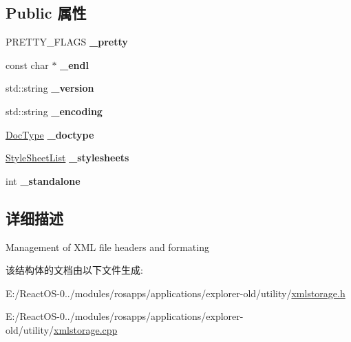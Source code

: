 \subsection*{Public 属性}
\begin{DoxyCompactItemize}
\item 
\mbox{\label{struct_x_m_l_storage_1_1_x_m_l_format_aac71a6dd578f9a09d35def6f3ffdad4e}} 
P\+R\+E\+T\+T\+Y\+\_\+\+F\+L\+A\+GS {\bfseries \+\_\+pretty}
\item 
\mbox{\label{struct_x_m_l_storage_1_1_x_m_l_format_a005c11c99db5757860a841e9a7d739d9}} 
const char $\ast$ {\bfseries \+\_\+endl}
\item 
\mbox{\label{struct_x_m_l_storage_1_1_x_m_l_format_aae13fc148edfc2b4342d849ee505d46e}} 
std\+::string {\bfseries \+\_\+version}
\item 
\mbox{\label{struct_x_m_l_storage_1_1_x_m_l_format_aa838d8817c7f68544ef41c76dbc60318}} 
std\+::string {\bfseries \+\_\+encoding}
\item 
\mbox{\label{struct_x_m_l_storage_1_1_x_m_l_format_a3fffc8c312e277e46890ca7d179bbbff}} 
\hyperlink{struct_x_m_l_storage_1_1_doc_type}{Doc\+Type} {\bfseries \+\_\+doctype}
\item 
\mbox{\label{struct_x_m_l_storage_1_1_x_m_l_format_ad2aab057278db1ba3815ed4fc72390e1}} 
\hyperlink{struct_x_m_l_storage_1_1_style_sheet_list}{Style\+Sheet\+List} {\bfseries \+\_\+stylesheets}
\item 
\mbox{\label{struct_x_m_l_storage_1_1_x_m_l_format_ac93ce665f8a0980cc329cc2fee6340bf}} 
int {\bfseries \+\_\+standalone}
\end{DoxyCompactItemize}


\subsection{详细描述}
Management of X\+ML file headers and formating 

该结构体的文档由以下文件生成\+:\begin{DoxyCompactItemize}
\item 
E\+:/\+React\+O\+S-\/0../modules/rosapps/applications/explorer-\/old/utility/\hyperlink{xmlstorage_8h}{xmlstorage.\+h}\item 
E\+:/\+React\+O\+S-\/0../modules/rosapps/applications/explorer-\/old/utility/\hyperlink{xmlstorage_8cpp}{xmlstorage.\+cpp}\end{DoxyCompactItemize}
